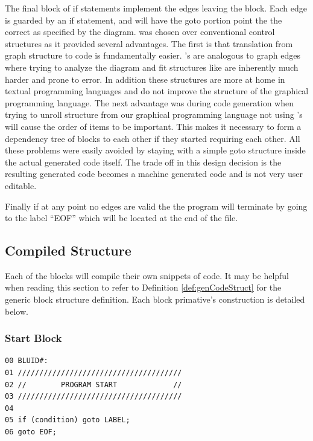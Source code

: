 The final block of if statements implement the edges leaving the block. 
Each edge is guarded by an if statement, and will have the goto portion 
point the the correct  as specified by the diagram.  was chosen over conventional control structures as it provided several advantages. The first is that translation from graph structure to code is fundamentally easier. 's are analogous to graph edges where trying to analyze the diagram and fit structures like   are inherently much harder and prone to error. In addition these structures are more at home in textual programming languages and do not improve the structure of the graphical programming language. The next advantage was during code generation when trying to unroll structure from our graphical programming language not using 's will cause the order of items to be important. This makes it necessary to form a dependency tree of blocks to each other if they started requiring each other. All these problems were easily avoided by staying with a simple goto structure inside the actual generated  code itself. The trade off in this design decision is the resulting generated code becomes a machine generated code and is not very user editable. 

Finally if at any point no edges are valid the the program will terminate by going to the label ``EOF'' which will be located at the end of the file.


\subsection{Compiled Structure}
\label{compiler}

Each of the blocks will compile their own snippets of code. 
It may be helpful when reading this section to refer to 
Definition \ref{def:genCodeStruct} for the generic block 
structure definition. Each block primative's construction
is detailed below.

\subsubsection{Start Block}
\label{def:cmpstartblock}
\begin{lstlisting}[frame=single]
00 BLUID#:
01 //////////////////////////////////////
02 //        PROGRAM START             //
03 //////////////////////////////////////
04 
05 if (condition) goto LABEL;
06 goto EOF;
\end{lstlisting}

